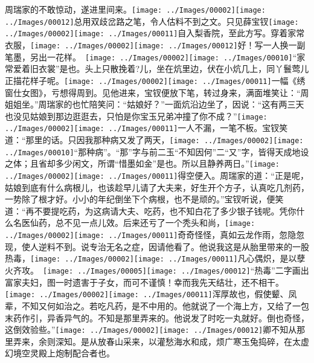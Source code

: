 周瑞家的不敢惊动，遂进里间来。{\texttt{[image: ../Images/00002]}\texttt{[image: ../Images/00012]}\footnotesize \kaishu 总用双歧岔路之笔，令人估料不到之文。}只见薛宝钗{\texttt{[image: ../Images/00002]}\texttt{[image: ../Images/00011]}\footnotesize \kaishu 自入梨香院，至此方写。}穿着家常衣服，{\texttt{[image: ../Images/00002]}\texttt{[image: ../Images/00012]}\footnotesize \kaishu 好！写一人换一副笔墨，另出一花样。　\texttt{[image: ../Images/00002]}\texttt{[image: ../Images/00010]}\footnotesize \kaishu ``家常爱着旧衣裳''是也。}头上只散挽着?儿，坐在炕里边，伏在小炕几上，同丫鬟莺儿正描花样子呢。{\texttt{[image: ../Images/00002]}\texttt{[image: ../Images/00011]}\footnotesize \kaishu 一幅《绣窗仕女图》，亏想得周到。}见他进来，宝钗便放下笔，转过身来，满面堆笑让：``周姐姐坐。''周瑞家的也忙陪笑问：``姑娘好？''一面炕沿边坐了，因说：``这有两三天也没见姑娘到那边逛逛去，只怕是你宝玉兄弟冲撞了你不成？''{\texttt{[image: ../Images/00002]}\texttt{[image: ../Images/00011]}\footnotesize \kaishu 一人不漏，一笔不板。}宝钗笑道：``那里的话。只因我那种病又发了两天，{\texttt{[image: ../Images/00002]}\texttt{[image: ../Images/00010]}\footnotesize \kaishu ``那种病''。``那''字与前二玉``不知因何''二``又''字，皆得天成地设之体；且省却多少闲文，所谓``惜墨如金''是也。}所以且静养两日。''{\texttt{[image: ../Images/00002]}\texttt{[image: ../Images/00011]}\footnotesize \kaishu 得空便入。}周瑞家的道：``正是呢，姑娘到底有什么病根儿，也该趁早儿请了大夫来，好生开个方子，认真吃几剂药，一势除了根才好。小小的年纪倒坐下个病根，也不是顽的。''宝钗听说，便笑道：``再不要提吃药，为这病请大夫、吃药，也不知白花了多少银子钱呢。凭你什么名医仙药，总不见一点儿效。后来还亏了一个秃头和尚，{\texttt{[image: ../Images/00002]}\texttt{[image: ../Images/00011]}\footnotesize \kaishu 奇奇怪怪，真如云龙作雨，忽隐忽现，使人逆料不到。}说专治无名之症，因请他看了。他说我这是从胎里带来的一股热毒，{{\texttt{[image: ../Images/00002]}\texttt{[image: ../Images/00011]}\footnotesize \kaishu 凡心偶炽，是以孽火齐攻。　}\texttt{[image: ../Images/00005]}\texttt{[image: ../Images/00012]}\footnotesize \kaishu ``热毒''二字画出富家夫妇，图一时遗害于子女，而可不谨慎！}幸而我先天结壮，还不相干。{\texttt{[image: ../Images/00002]}\texttt{[image: ../Images/00011]}\footnotesize \kaishu 浑厚故也，假使颦、凤辈，不知又何如治之。}若吃凡药，是不中用的。他就说了一个海上方，又给了一包末药作引，异香异气的。不知是那里弄来的。他说发了时吃一丸就好。倒也奇怪，这倒效验些。''{\texttt{[image: ../Images/00002]}\texttt{[image: ../Images/00012]}\footnotesize \kaishu 卿不知从那里弄来，余则深知。是从放春山采来，以灌愁海水和成，烦广寒玉兔捣碎，在太虚幻境空灵殿上炮制配合者也。}

